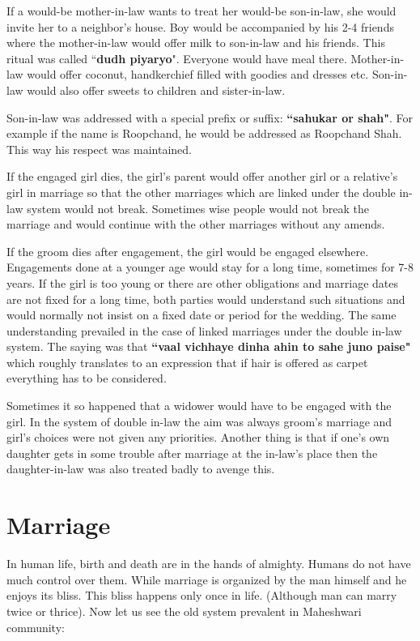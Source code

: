 If a would-be mother-in-law wants to treat her would-be son-in-law, she would
invite her to a neighbor's house. Boy would be accompanied by his 2-4 friends
where the mother-in-law would offer milk to son-in-law and his friends. This
ritual was called ``\textbf{dudh piyaryo}". Everyone would have meal there.
Mother-in-law would offer coconut, handkerchief filled with goodies and dresses
etc. Son-in-law would also offer sweets to children and sister-in-law. 

Son-in-law was addressed with a special prefix or suffix: \textbf{``sahukar or
shah"}. For example if the name is Roopchand, he would be addressed as
Roopchand Shah. This way his respect was maintained.

If the engaged girl dies, the girl's parent would offer another girl or a
relative's girl in marriage so that the other marriages which are linked under
the double in-law system would not break. Sometimes wise people would not break
the marriage and would continue with the other marriages without any amends.

If the groom dies after engagement, the girl would be engaged elsewhere.
Engagements done at a younger age would stay for a long  time, sometimes for
7-8 years. If the girl is too young or there are other obligations and marriage
dates are not fixed for a long time, both parties would understand such
situations and would normally not insist on a fixed date or period for the
wedding. The same understanding prevailed in the case of linked marriages under
the double in-law system. The saying was that \textbf{``vaal vichhaye dinha
ahin to sahe juno paise"} which roughly translates to an expression that if
hair is offered as carpet everything has to be considered.

Sometimes it so happened that a widower would have to be engaged with  the
girl. In the system of double in-law the aim was always groom's marriage and
girl's choices were not given any priorities. Another thing is that if one's
own daughter gets in some trouble after marriage at the in-law's place then the
daughter-in-law was also treated badly to avenge this.

\section{Marriage}
In human life, birth and death are in the hands of almighty. Humans do not have
much control over them. While marriage is organized by the man himself and he
enjoys its bliss. This bliss happens only once in life. (Although man can marry
twice or thrice). Now let us see the old system prevalent in Maheshwari
community:

